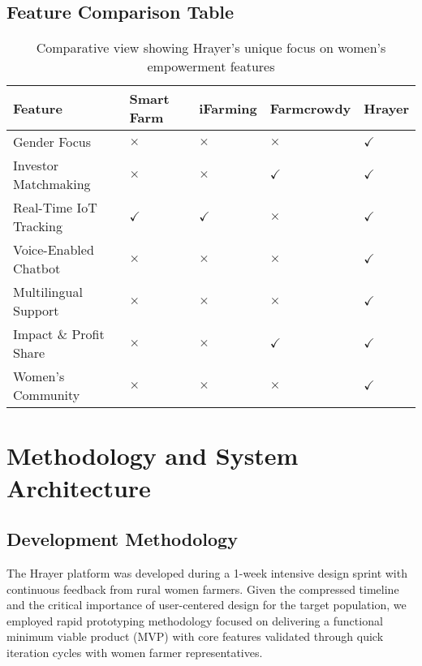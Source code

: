\documentclass[9pt,twocolumn,twoside]{article}
\begin{document}
\subsection*{Feature Comparison Table}

\begin{table}[h!]
\centering
\small
\renewcommand{\arraystretch}{1.3}
\begin{tabular}{l >{\centering\arraybackslash}p{0.6cm} >{\centering\arraybackslash}p{0.9cm} >{\centering\arraybackslash}p{1.55cm} >{\centering\arraybackslash}p{1.0cm}}
\toprule
\textbf{Feature} & Smart Farm & iFarming  & Farmcrowdy & \textbf{Hrayer} \\
\midrule
Gender Focus     & $\times$ & $\times$  & $\times$ & $\checkmark$ \\
Investor Matchmaking     & $\times$ & $\times$  & $\checkmark$ & $\checkmark$ \\
Real-Time IoT Tracking & $\checkmark$ & $\checkmark$ & $\times$ & $\checkmark$ \\
Voice-Enabled Chatbot     & $\times$ & $\times$ & $\times$ & $\checkmark$ \\
Multilingual Support     & $\times$ & $\times$ & $\times$ & $\checkmark$ \\
Impact \& Profit Share     & $\times$ & $\times$ & $\checkmark$ & $\checkmark$ \\
Women's Community     & $\times$ & $\times$ & $\times$ & $\checkmark$ \\
\bottomrule
\end{tabular}
\caption{Comparative view showing Hrayer's unique focus on women's empowerment features}
\label{tab:feature_comparison}
\end{table}

\section{Methodology and System Architecture} \label{sec:methodology}
\subsection{Development Methodology}

The Hrayer platform was developed during a 1-week intensive design sprint with continuous feedback from rural women farmers. Given the compressed timeline and the critical importance of user-centered design for the target population, we employed rapid prototyping methodology focused on delivering a functional minimum viable product (MVP) with core features validated through quick iteration cycles with women farmer representatives.
\end{document}
